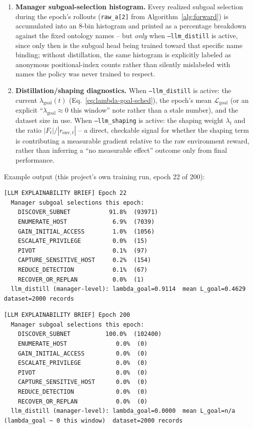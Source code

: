 \documentclass[11pt]{article}
\newcommand{\code}[1]{\texttt{#1}}
\begin{document}
\begin{enumerate}[leftmargin=1.4em]
  \item \textbf{Manager subgoal-selection histogram.} Every realized subgoal
    selection during the epoch's rollouts (\code{raw\_a[2]} from
    Algorithm~\ref{alg:forward}) is accumulated into an 8-bin histogram and printed
    as a percentage breakdown against the fixed ontology names -- but \emph{only}
    when \code{--llm\_distill} is active, since only then is the subgoal head being
    trained toward that specific name binding; without distillation, the same
    histogram is explicitly labeled as anonymous positional-index counts rather than
    silently mislabeled with names the policy was never trained to respect.
  \item \textbf{Distillation/shaping diagnostics.} When \code{--llm\_distill} is
    active: the current $\lambda_{\text{goal}}(t)$ (Eq.~\ref{eq:lambda-goal-sched}),
    the epoch's mean $\mathcal{L}_{\text{goal}}$ (or an explicit ``$\lambda_{\text{goal}}
    \approx 0$ this window'' note rather than a stale number), and the dataset size in
    use. When \code{--llm\_shaping} is active: the shaping weight $\lambda_t$ and the
    ratio $|F_t| / |r_{\text{env},t}|$ -- a direct, checkable signal for whether the
    shaping term is contributing a measurable gradient relative to the raw
    environment reward, rather than inferring a ``no measurable effect'' outcome only
    from final performance.
\end{enumerate}

\noindent Example output (this project's own training run, epoch 22 of 200):
\begin{lstlisting}[caption={Explainability brief, early training (11\% through the run)}]
[LLM EXPLAINABILITY BRIEF] Epoch 22
  Manager subgoal selections this epoch:
    DISCOVER_SUBNET           91.8%  (93971)
    ENUMERATE_HOST             6.9%  (7039)
    GAIN_INITIAL_ACCESS        1.0%  (1056)
    ESCALATE_PRIVILEGE         0.0%  (15)
    PIVOT                      0.1%  (97)
    CAPTURE_SENSITIVE_HOST     0.2%  (154)
    REDUCE_DETECTION           0.1%  (67)
    RECOVER_OR_REPLAN          0.0%  (1)
  llm_distill (manager-level): lambda_goal=0.9114  mean L_goal=0.4629  dataset=2000 records
\end{lstlisting}

\begin{lstlisting}[caption={Same run, epoch 200 (final) -- subgoal-selection collapse}]
[LLM EXPLAINABILITY BRIEF] Epoch 200
  Manager subgoal selections this epoch:
    DISCOVER_SUBNET          100.0%  (102400)
    ENUMERATE_HOST              0.0%  (0)
    GAIN_INITIAL_ACCESS         0.0%  (0)
    ESCALATE_PRIVILEGE          0.0%  (0)
    PIVOT                       0.0%  (0)
    CAPTURE_SENSITIVE_HOST      0.0%  (0)
    REDUCE_DETECTION            0.0%  (0)
    RECOVER_OR_REPLAN           0.0%  (0)
  llm_distill (manager-level): lambda_goal=0.0000  mean L_goal=n/a (lambda_goal ~ 0 this window)  dataset=2000 records
\end{lstlisting}
\end{document}
